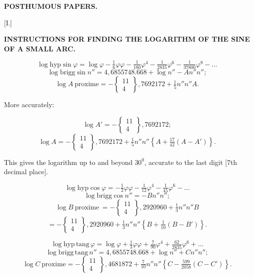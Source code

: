 
\clearpage{}




\begin{center}
\textbf{POSTHUMOUS PAPERS.}
\end{center}

\begin{center}
[I.]
\end{center}

\begin{center}
\textbf{INSTRUCTIONS FOR FINDING THE LOGARITHM OF THE SINE OF A
SMALL ARC.}
\end{center}

\[
\log\mathrm{hyp}\sin\varphi = \log\varphi - \tfrac{1}{6}\varphi\varphi - \tfrac{1}{180}\varphi^4 - \tfrac{1}{2835}\varphi^6 - \tfrac{1}{37800}\varphi^8 - \ldots
\]
\[
\log\mathrm{brigg}\sin n'' = 4{,}6855748.668 + \log n'' - An''n'';
\]
\[
\log A\ \mathrm{proxime} = -\left\{\!\begin{smallmatrix}11\\4\end{smallmatrix}\!\right\}{,}7692172 + \tfrac{1}{5}n''n''A.
\]

More accurately:

\[
\log A' = -\left\{\!\begin{smallmatrix}11\\4\end{smallmatrix}\!\right\}{,}7692172;
\]
\[
\log A = -\left\{\!\begin{smallmatrix}11\\4\end{smallmatrix}\!\right\}{,}7692172 + \tfrac{1}{5}n''n''\left\{A+\tfrac{17}{42}(A-A')\right\}.
\]

This gives the logarithm up to and beyond $30^0$, accurate to the last digit [7th decimal place].

\[
\log\mathrm{hyp}\cos\varphi = -\tfrac{1}{2}\varphi\varphi - \tfrac{1}{12}\varphi^4 - \tfrac{1}{45}\varphi^6 - \ldots
\]
\[
\log\mathrm{brigg}\cos n'' = -Bn''n'';
\]
\[
\log B\ \mathrm{proxime}\ = -\left\{\!\begin{smallmatrix}11\\4\end{smallmatrix}\!\right\}{,}2920960 + \tfrac{1}{3}n''n''B
\]
\[
= -\left\{\!\begin{smallmatrix}11\\4\end{smallmatrix}\!\right\}{,}2920960 + \tfrac{1}{3}n''n''\left\{B+\tfrac{1}{10}(B-B')\right\}.
\]

\[
\log\mathrm{hyp}\,\mathrm{tang}\,\varphi = \log\varphi + \tfrac{1}{3}\varphi\varphi + \tfrac{7}{90}\varphi^4 + \tfrac{62}{2835}\varphi^6 + \ldots
\]
\[
\log\mathrm{brigg}\,\mathrm{tang}\,n'' = 4{,}6855748.668 + \log n'' + Cn''n'';
\]
\[
\log C\ \mathrm{proxime} = -\left\{\!\begin{smallmatrix}11\\4\end{smallmatrix}\!\right\}{,}4681872 + \tfrac{7}{10}n''n''\left\{C-\tfrac{599}{2058}(C-C')\right\}. 
\]
